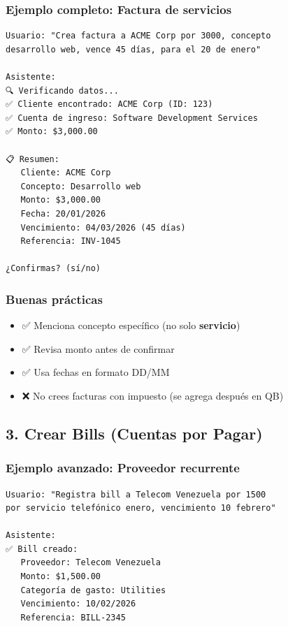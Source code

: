 \documentclass[12pt,oneside]{article}
\begin{document}
\subsubsection{Ejemplo completo: Factura de servicios}

\begin{verbatim}
Usuario: "Crea factura a ACME Corp por 3000, concepto 
desarrollo web, vence 45 días, para el 20 de enero"

Asistente:
🔍 Verificando datos...
✅ Cliente encontrado: ACME Corp (ID: 123)
✅ Cuenta de ingreso: Software Development Services
✅ Monto: $3,000.00

📋 Resumen:
   Cliente: ACME Corp
   Concepto: Desarrollo web
   Monto: $3,000.00
   Fecha: 20/01/2026
   Vencimiento: 04/03/2026 (45 días)
   Referencia: INV-1045

¿Confirmas? (sí/no)
\end{verbatim}

\subsubsection{Buenas prácticas}

\begin{itemize}
    \item ✅ Menciona concepto específico (no solo \textbf{servicio})
    \item ✅ Revisa monto antes de confirmar
    \item ✅ Usa fechas en formato DD/MM
    \item ❌ No crees facturas con impuesto (se agrega después en QB)
\end{itemize}

\subsection{3. Crear Bills (Cuentas por Pagar)}

\subsubsection{Ejemplo avanzado: Proveedor recurrente}

\begin{verbatim}
Usuario: "Registra bill a Telecom Venezuela por 1500 
por servicio telefónico enero, vencimiento 10 febrero"

Asistente:
✅ Bill creado:
   Proveedor: Telecom Venezuela
   Monto: $1,500.00
   Categoría de gasto: Utilities
   Vencimiento: 10/02/2026
   Referencia: BILL-2345
\end{verbatim}
\end{document}
